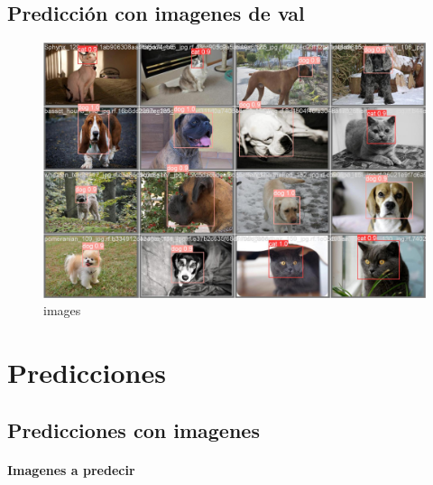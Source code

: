 \documentclass[11pt]{article}
\begin{document}
    \subsection{Predicción con imagenes de
val}\label{predicciuxf3n-con-imagenes-de-val}

    \begin{figure}
\centering
\includegraphics{results/val_batch1_pred.jpg}
\caption{images}
\end{figure}

    \section{Predicciones}\label{predicciones}

    \subsection{Predicciones con
imagenes}\label{predicciones-con-imagenes}

    \paragraph{Imagenes a predecir}\label{imagenes-a-predecir}
\end{document}
